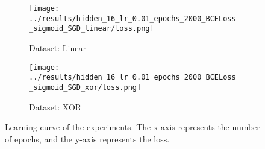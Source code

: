 \begin{figure}[H]
    \centering
    \begin{subfigure}[b]{0.45\textwidth}
        \centering
        \texttt{[image: ../results/hidden\_16\_lr\_0.01\_epochs\_2000\_BCELoss\_sigmoid\_SGD\_linear/loss.png]}
        \caption{Dataset: Linear}
    \end{subfigure}
    \begin{subfigure}[b]{0.45\textwidth}
        \centering
        \texttt{[image: ../results/hidden\_16\_lr\_0.01\_epochs\_2000\_BCELoss\_sigmoid\_SGD\_xor/loss.png]}
        \caption{Dataset: XOR}
    \end{subfigure}
    \caption{Learning curve of the experiments. The x-axis represents the number of epochs, and the y-axis represents the loss.}
\end{figure}
